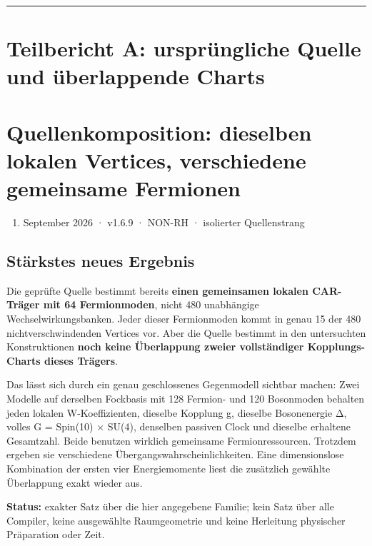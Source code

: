 \begin{center}\rule{0.5\linewidth}{0.5pt}\end{center}

\section{Teilbericht A: ursprüngliche Quelle und überlappende
Charts}\label{teilbericht-a-urspruxfcngliche-quelle-und-uxfcberlappende-charts}

\section{Quellenkomposition: dieselben lokalen Vertices, verschiedene
gemeinsame
Fermionen}\label{quellenkomposition-dieselben-lokalen-vertices-verschiedene-gemeinsame-fermionen}

\begin{enumerate}
\def\labelenumi{\arabic{enumi}.}
\setcounter{enumi}{14}
\tightlist
\item
  September 2026 · v1.6.9 · NON-RH · isolierter Quellenstrang
\end{enumerate}

\subsection{Stärkstes neues Ergebnis}\label{stuxe4rkstes-neues-ergebnis}

Die geprüfte Quelle bestimmt bereits \textbf{einen gemeinsamen lokalen
CAR-Träger mit 64 Fermionmoden}, nicht 480 unabhängige
Wechselwirkungsbanken. Jeder dieser Fermionmoden kommt in genau 15 der
480 nichtverschwindenden Vertices vor. Aber die Quelle bestimmt in den
untersuchten Konstruktionen \textbf{noch keine Überlappung zweier
vollständiger Kopplungs-Charts dieses Trägers}.

Das lässt sich durch ein genau geschlossenes Gegenmodell sichtbar
machen: Zwei Modelle auf derselben Fockbasis mit 128 Fermion- und 120
Bosonmoden behalten jeden lokalen W-Koeffizienten, dieselbe Kopplung g,
dieselbe Bosonenergie Δ, volles G = Spin(10) × SU(4), denselben passiven
Clock und dieselbe erhaltene Gesamtzahl. Beide benutzen wirklich
gemeinsame Fermionressourcen. Trotzdem ergeben sie verschiedene
Übergangswahrscheinlichkeiten. Eine dimensionslose Kombination der
ersten vier Energiemomente liest die zusätzlich gewählte Überlappung
exakt wieder aus.

\textbf{Status:} exakter Satz über die hier angegebene Familie; kein
Satz über alle Compiler, keine ausgewählte Raumgeometrie und keine
Herleitung physischer Präparation oder Zeit.

